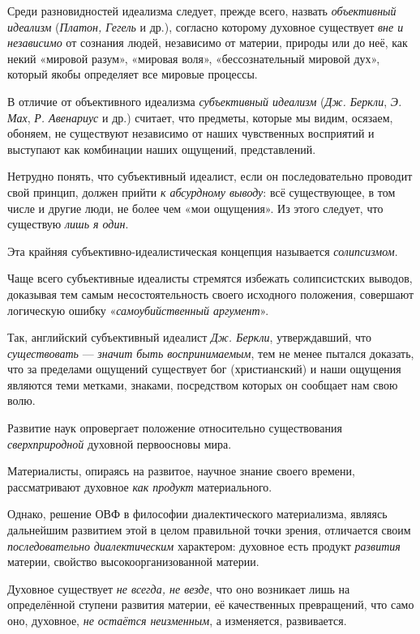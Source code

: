 \documentclass[a4paper,14pt,russian]{extreport}
\begin{document}
Среди разновидностей идеализма следует, прежде всего, назвать \emph{объективный идеализм} (\emph{Платон, Гегель} и др.), согласно которому духовное существует \emph{вне и независимо} от сознания людей, независимо от материи, природы или до неё, как некий «мировой разум», «мировая воля», «бессознательный мировой дух», который якобы определяет все мировые процессы.

В отличие от объективного идеализма \emph{субъективный идеализм} (\emph{Дж. Беркли}, \emph{Э. Мах}, \emph{Р. Авенариус} и др.) считает, что предметы, которые мы видим, осязаем, обоняем, не существуют независимо от наших чувственных восприятий и выступают как комбинации наших ощущений, представлений.

Нетрудно понять, что субъективный идеалист, если он последовательно проводит свой принцип, должен прийти \emph{к абсурдному выводу}: всё существующее, в том числе и другие люди, не более чем «мои ощущения». Из этого следует, что существую \emph{лишь я один}.

Эта крайняя субъективно-идеалистическая концепция называется \emph{солипсизмом}.

Чаще всего субъективные идеалисты стремятся избежать солипсистских выводов, доказывая тем самым несостоятельность своего исходного положения, совершают логическую ошибку «\emph{самоубийственный аргумент}».

Так, английский субъективный идеалист \emph{Дж. Беркли}, утверждавший, что \emph{существовать} --- \emph{значит быть воспринимаемым}, тем не менее пытался доказать, что за пределами ощущений существует бог (христианский) и наши ощущения являются теми метками, знаками, посредством которых он сообщает нам свою волю.

Развитие наук опровергает положение относительно существования \emph{сверхприродной} духовной первоосновы мира.

Материалисты, опираясь на развитое, научное знание своего времени, рассматривают духовное \emph{как продукт} материального.

Однако, решение ОВФ в философии диалектического материализма, являясь дальнейшим развитием этой в целом правильной точки зрения, отличается своим \emph{последовательно} \emph{диалектическим} характером: духовное есть продукт \emph{развития} материи, свойство высокоорганизованной материи.

Духовное существует \emph{не всегда, не везде}, что оно возникает лишь на определённой ступени развития материи, её качественных превращений, что само оно, духовное, \emph{не остаётся неизменным}, а изменяется, развивается.
\end{document}
